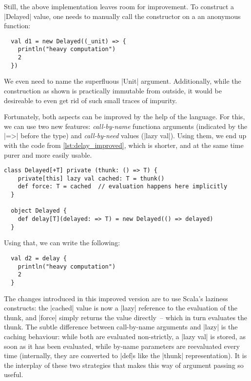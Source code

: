 Still, the above implementation leaves room for improvement. To construct a |Delayed| value, one
needs to manually call the constructor on a an anonymous function:
\begin{lstlisting}
  val d1 = new Delayed((_unit) => {
    println("heavy computation")
    2
  })
\end{lstlisting}
We even need to name the superfluous |Unit| argument. Additionally, while the construction as shown
is practically immutable from outside, it would be desireable to even get rid of such small traces
of impurity. 

Fortunately, both aspects can be improved by the help of the language. For this, we can use two new
features: \emph{call-by-name} functiona arguments (indicated by the |=>| before the type) and
\emph{call-by-need} values (|lazy val|). Using them, we end up with the code from
\autoref{lst:delay_improved}, which is shorter, and at the same time purer and more easily usable.
\begin{lstlisting}[style=floating,
  caption={Improved \lstinline|Delayed| implementation, using Scala's laziness and block
    constructs. The \lstinline|delay| \enquote{factory} is declared inside the companion object,
    while the default constructor of \lstinline|Delayed| is set private.
    \hfill\github{dsl-examples/blob/master/src/main/scala/dsl_examples/delay/Delay2.scala}},
  label=lst:delay_improved]
  class Delayed[+T] private (thunk: () => T) {
    private[this] lazy val cached: T = thunk()
    def force: T = cached  // evaluation happens here implicitly
  }

  object Delayed {
    def delay[T](delayed: => T) = new Delayed(() => delayed)
  }
\end{lstlisting}
Using that, we can write the following:
\begin{lstlisting}
  val d2 = delay {
    println("heavy computation")
    2
  }
\end{lstlisting}

The changes introduced in this improved version are to use Scala's laziness constructs: the |cached|
value is now a |lazy| reference to the evaluation of the thunk, and |force| simply returns the value
directly~-- which in turn evaluates the thunk. The subtle difference between call-by-name arguments
and |lazy| is the caching behaviour: while both are evaluated non-strictly, a |lazy val| is stored,
as soon as it has been evaluated, while by-name parameters are reevaluated every time (internally,
they are converted to |def|s like the |thunk| representation). It is the interplay of these two
strategies that makes this way of argument passing so useful.

